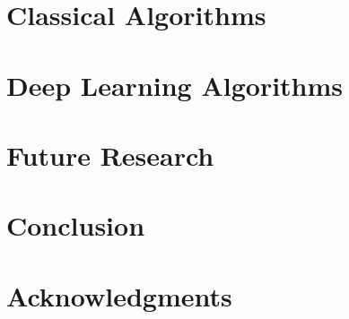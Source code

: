 \documentclass[journal]{IEEEtran}
\begin{document}
    \section{Classical Algorithms}\label{sec:classical-algorithms}
    \section{Deep Learning Algorithms}\label{sec:deep-learning-algorithms}
    \section{Future Research}\label{sec:future-research}
    \section{Conclusion}\label{sec:conclusion}

    \section*{Acknowledgments}
    \newpage
    \printbibliography
\end{document}

